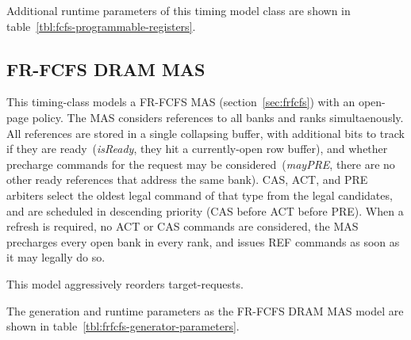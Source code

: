\noindent Additional runtime parameters of this timing model class are shown in
table~\ref{tbl:fcfs-programmable-registers}.

\begin{table}[htb]
\begin{center}
\end{center}
\caption{Programmable registers of the FCFS DRAM MAS model.}
\label{tbl:fcfs-programmable-registers}
\end{table}%

\subsection{FR-FCFS DRAM MAS}
This timing-class models a FR-FCFS MAS (section~\ref{sec:frfcfs}) with an open-page
policy. The MAS considers references to all banks and ranks simultaenously. All
references are stored in a single collapsing buffer, with additional bits to
track if they are ready~(\emph{isReady}, they hit a currently-open row
buffer), and whether precharge commands for the request may be
considered~(\emph{mayPRE}, there are no other ready references that address the
same bank). CAS, ACT, and PRE arbiters select the oldest legal command of that
type from the legal candidates, and are scheduled in descending priority (CAS
before ACT before PRE). When a refresh is required, no ACT or CAS commands are
considered, the MAS precharges every open bank in every rank, and issues REF
commands as soon as it may legally do so.

This model aggressively reorders target-requests.

The generation and runtime parameters as the FR-FCFS DRAM MAS model are shown
in table~\ref{tbl:frfcfs-generator-parameters}.

\begin{table}[htb]
\begin{center}
\end{center}
\caption{Generation parameters of the DDR3 FR-FCFS MAS model.}
\label{tbl:frfcfs-generator-parameters}
\end{table}%

